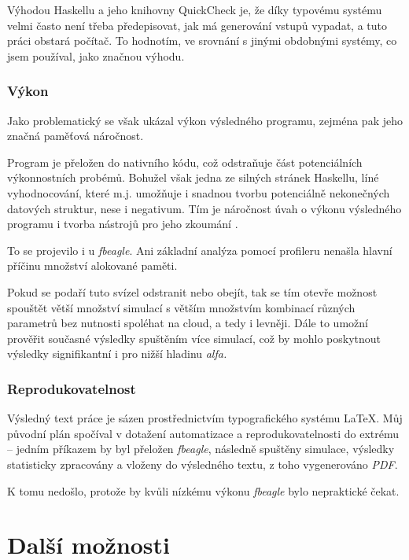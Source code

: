 \begin{tcolorbox}[ title={Vhodnost zvolených nástrojů pro simulaci}
                 , breakable
                 ]
Výhodou Haskellu a jeho knihovny QuickCheck \citep{Claessen:2000:QLT:351240.351266} je, že díky typovému systému velmi
často není třeba předepisovat, jak má generování vstupů vypadat, a tuto práci obstará počítač.
To hodnotím, ve srovnání s jinými obdobnými systémy, co jsem používal, jako značnou výhodu.

\subsubsection*{Výkon}

Jako problematický se však ukázal výkon výsledného programu, zejména pak jeho značná paměťová náročnost.

Program je přeložen do nativního kódu, což odstraňuje část potenciálních výkonnostních probémů. Bohužel však jedna ze silných stránek
Haskellu, líné vyhodnocování, které m.j. umožňuje i snadnou tvorbu potenciálně nekonečných datových struktur, nese i negativum.
Tím je náročnost úvah o výkonu výsledného programu i tvorba nástrojů pro jeho zkoumání \citep{wadler1998no}.

To se projevilo i u \textit{fbeagle}. Ani základní analýza pomocí profileru nenašla hlavní příčinu množství alokované paměti.

Pokud se podaří tuto svízel odstranit nebo obejít, tak se tím otevře možnost spouštět větší množství simulací s větším množstvím kombinací
různých parametrů bez nutnosti spoléhat na cloud, a tedy i levněji. Dále to umožní prověřit současné výsledky spuštěním více simulací, což by
mohlo poskytnout výsledky signifikantní i pro nižší hladinu \textit{alfa.}

\subsubsection*{Reprodukovatelnost}

Výsledný text práce je sázen prostřednictvím typografického systému \LaTeX. Můj původní plán spočíval v dotažení automatizace a
reprodukovatelnosti do extrému -- jedním příkazem by byl přeložen \textit{fbeagle}, následně spuštěny simulace, výsledky statisticky
zpracovány a vloženy do výsledného textu, z toho vygenerováno \textit{PDF}.

K tomu nedošlo, protože by kvůli nízkému výkonu \textit{fbeagle} bylo nepraktické čekat.

\end{tcolorbox}

\section{Další možnosti}

